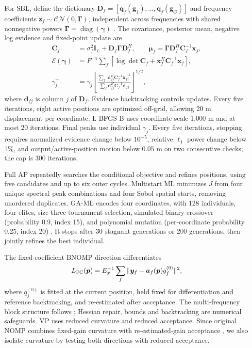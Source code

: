 \documentclass[a4paper,fleqn,review]{cas-sc}
\begin{document}
For SBL, define the dictionary $\bm D_f=[\bm q_f(\bm g_1),\ldots,\bm q_f(\bm g_G)]$ and frequency coefficients $\bm z_f\sim\mathcal{CN}(0,\bm\Gamma)$, independent across frequencies with shared nonnegative powers $\bm\Gamma=\operatorname{diag}(\bm\gamma)$ \cite{Nannuru2019}. The covariance, posterior mean, negative log evidence and fixed-point update are
\begin{align}
\bm C_f&=\sigma_f^2\bm I_L+\bm D_f\bm\Gamma\bm D_f^H,\qquad
\bm\mu_f=\bm\Gamma\bm D_f^H\bm C_f^{-1}\bm x_f,\\
\mathcal E(\bm\gamma)&=F^{-1}\sum_f
[\log\det\bm C_f+\bm x_f^H\bm C_f^{-1}\bm x_f],\\
\gamma_j^+&=\gamma_j\left[
\frac{\sum_f|\bm d_{fj}^H\bm C_f^{-1}\bm x_f|^2}
{\sum_f\bm d_{fj}^H\bm C_f^{-1}\bm d_{fj}}
\right]^{1/2},
\end{align}
where $\bm d_{fj}$ is column $j$ of $\bm D_f$. Evidence backtracking controls updates. Every five iterations, eight active positions are optimized off-grid, allowing 20 m displacement per coordinate; L-BFGS-B uses coordinate scale 1,000 m and at most 20 iterations. Final peaks use individual $\gamma_j$. Every five iterations, stopping requires normalized evidence change below $10^{-5}$, relative $\ell_1$ power change below 1\%, and output/active-position motion below 0.05 m on two consecutive checks; the cap is 300 iterations.

Full AP repeatedly searches the conditional objective and refines positions, using five candidates and up to six outer cycles. Multistart ML minimizes $J$ from four unique spectral peak combinations and four Sobol spatial starts, removing unordered duplicates. GA-ML encodes four coordinates, with 128 individuals, four elites, size-three tournament selection, simulated binary crossover (probability 0.9, index 15), and polynomial mutation (per-coordinate probability 0.25, index 20) \cite{DebAgrawal1995}. It stops after 30 stagnant generations or 200 generations, then jointly refines the best individual.

The fixed-coefficient BNOMP direction differentiates
\begin{equation}
L_{\rm FC}(\bm p)=E_x^{-1}\sum_f
\|\bm y_f-\bm a_f(\bm p)q_f^{(0)}\|^2,
\label{en:fixedcoef}
\end{equation}
where $q_f^{(0)}$ is fitted at the current position, held fixed for differentiation and reference backtracking, and re-estimated after acceptance. The multi-frequency block structure follows \cite{Yang2022}; Hessian repair, bounds and backtracking are numerical safeguards. VP uses reduced curvature and reduced acceptance. Since original NOMP combines fixed-gain curvature with re-estimated-gain acceptance \cite{Mamandipoor2016}, we also isolate curvature by testing both directions with reduced acceptance.
\end{document}
